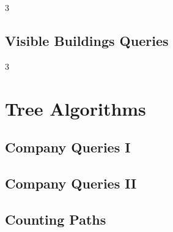 \documentclass[8pt]{extarticle}
\begin{document}
\begin{multicols*}{3}
\subsection{Visible Buildings Queries}
\begin{caixaenunciado}

\end{caixaenunciado}
\vspace{0.3cm}

\end{multicols*}
\pagebreak
\begin{multicols*}{3}

\section{Tree Algorithms}

\subsection{Company Queries I}
\begin{caixaenunciado}

\end{caixaenunciado}
\vspace{0.3cm}


\subsection{Company Queries II}
\begin{caixaenunciado}

\end{caixaenunciado}
\vspace{0.3cm}


\subsection{Counting Paths}
\begin{caixaenunciado}

\end{caixaenunciado}
\vspace{0.3cm}



\end{multicols*}
\end{document}
